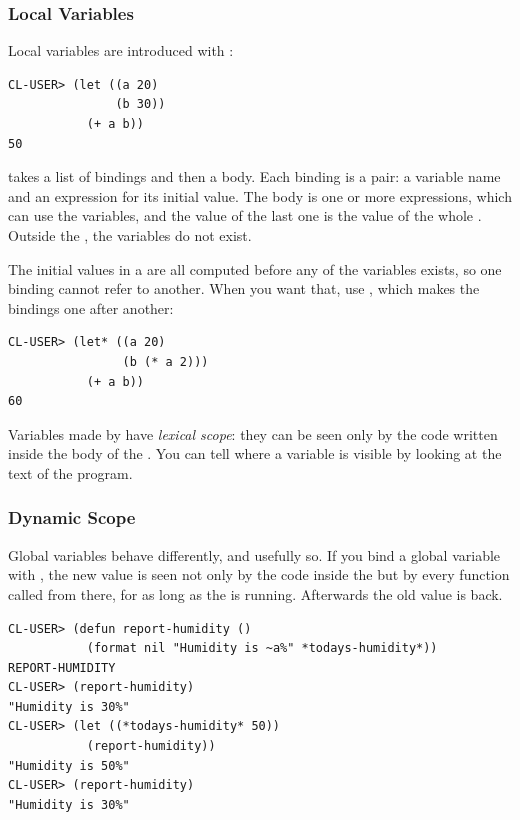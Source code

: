 \subsubsection{Local Variables}

Local variables are introduced with :

\begin{verbatim}
CL-USER> (let ((a 20)
               (b 30))
           (+ a b))
50
\end{verbatim}

 takes a list of bindings and then a body. Each binding is
a pair: a variable name and an expression for its initial value. The
body is one or more expressions, which can use the variables, and the
value of the last one is the value of the whole . Outside
the , the variables do not exist.

The initial values in a  are all computed before any of the
variables exists, so one binding cannot refer to another. When you
want that, use , which makes the bindings one after
another:

\begin{verbatim}
CL-USER> (let* ((a 20)
                (b (* a 2)))
           (+ a b))
60
\end{verbatim}

Variables made by  have \emph{lexical scope}: they can be
seen only by the code written inside the body of the . You
can tell where a variable is visible by looking at the text of the
program.

\subsubsection{Dynamic Scope}

Global variables behave differently, and usefully so. If you bind a
global variable with , the new value is seen not only by the
code inside the  but by every function called from there,
for as long as the  is running. Afterwards the old value is
back.

\begin{verbatim}
CL-USER> (defun report-humidity ()
           (format nil "Humidity is ~a%" *todays-humidity*))
REPORT-HUMIDITY
CL-USER> (report-humidity)
"Humidity is 30%"
CL-USER> (let ((*todays-humidity* 50))
           (report-humidity))
"Humidity is 50%"
CL-USER> (report-humidity)
"Humidity is 30%"
\end{verbatim}

